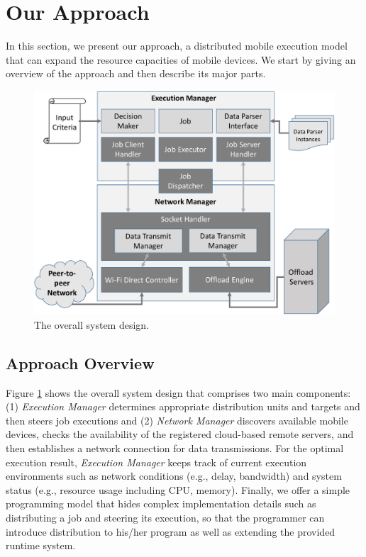 \documentclass{sig-alternate}
\begin{document}


\section{Our Approach}
\label{sec:approach}
In this section, we present our approach, a distributed mobile execution model that can expand the resource capacities of mobile devices. We start by giving an overview of the approach and then describe its major parts.

\begin{figure}
	\centering	
		\includegraphics[width=.98\linewidth]{data/jobShareArch.pdf}	
	\caption{The overall system design.}
	\label{fig:architecture}
\end{figure}


\subsection{Approach Overview}
Figure \ref{fig:architecture} shows the overall system design that comprises two main components: (1) \emph{Execution Manager} determines appropriate distribution units and targets and then steers job executions and (2) \emph{Network Manager} discovers available mobile devices, checks the availability of the registered cloud-based remote servers, and then establishes a network connection for data transmissions. For the optimal execution result, \emph{Execution Manager} keeps track of current execution environments such as network conditions (e.g., delay, bandwidth) and system status (e.g., resource usage including CPU, memory). Finally, we offer a simple programming model that hides complex implementation details such as distributing a job and steering its execution, so that the programmer can introduce distribution to his/her program as well as extending the provided runtime system.
\end{document}
